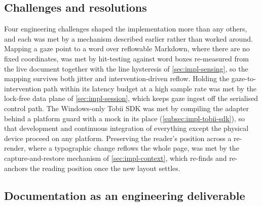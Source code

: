 \subsection{Challenges and resolutions}
\label{subsec:impl-challenges}

Four engineering challenges shaped the implementation more than any others, and each was met by a mechanism described earlier rather than worked around.
Mapping a gaze point to a word over reflowable Markdown, where there are no fixed coordinates, was met by hit-testing against word boxes re-measured from the live document together with the line hysteresis of \cref{sec:impl-sensing}, so the mapping survives both jitter and intervention-driven reflow.
Holding the gaze-to-intervention path within its latency budget at a high sample rate was met by the lock-free data plane of \cref{sec:impl-session}, which keeps gaze ingest off the serialised control path.
The Windows-only Tobii SDK was met by compiling the adapter behind a platform guard with a mock in its place (\cref{subsec:impl-tobii-sdk}), so that development and continuous integration of everything except the physical device proceed on any platform.
Preserving the reader's position across a re-render, where a typographic change reflows the whole page, was met by the capture-and-restore mechanism of \cref{sec:impl-context}, which re-finds and re-anchors the reading position once the new layout settles.

\subsection{Documentation as an engineering deliverable}
\label{subsec:impl-docs-site}

